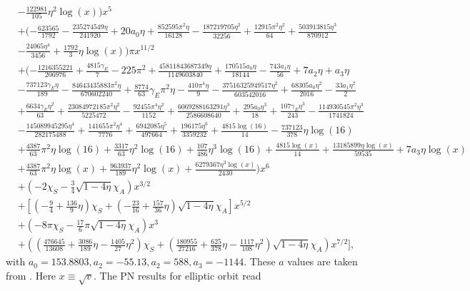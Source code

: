 \documentclass[prd,aps,a4paper,superscriptaddress,twocolumn,footinbib,showpacs]{revtex4}
\begin{document}
\begin{widetext}
\begin{align}
&-\frac{122981}{105} \eta ^2 \log(x))x^5\nonumber\\
&+(-\frac{623565 }{1792}-\frac{235274549 \eta }{241920}+20 a_0  \eta +\frac{852595 \pi ^2 \eta }{16128}-\frac{187219705 \eta ^2}{32256}+\frac{12915 \pi ^2 \eta ^2}{64}+\frac{503913815 \eta ^3}{870912}\nonumber\\
&-\frac{24065 \eta ^4}{3456}+\frac{1792}{3} \eta  \log(x)) \pi x^{11/2}\nonumber\\
&+(-\frac{1216355221}{206976}+\frac{4815 \gamma_E}{7}-225 \pi ^2+\frac{45811843687349 \eta }{1149603840}+\frac{170515 a_0 \eta }{18144}-\frac{743 a_1 \eta }{56}+7 a_2 \eta +a_3 \eta \nonumber\\
&-\frac{737123 \gamma_E \eta }{189}-\frac{84643435883 \pi ^2 \eta }{670602240}+\frac{8774}{63} \gamma_E \pi ^2 \eta -\frac{410 \pi ^4 \eta }{9}-\frac{37516325949517 \eta ^2}{603542016}+\frac{68305 a_0 \eta ^2}{2016}-\frac{33 a_1 \eta ^2}{2}\nonumber\\
&+\frac{6634 \gamma_E \eta ^2}{63}+\frac{23084972185 \pi ^2 \eta ^2}{5225472}-\frac{92455 \pi ^4 \eta ^2}{1152}+\frac{6069288163291 \eta ^3}{2586608640}+\frac{295 a_0 \eta ^3}{18}+\frac{107 \gamma_E \eta ^3}{243}-\frac{114930545 \pi ^2 \eta ^3}{1741824}\nonumber\\
&-\frac{145089945295 \eta ^4}{282175488}+\frac{141655 \pi ^2 \eta ^4}{7776}+\frac{6942085 \eta ^5}{497664}+\frac{196175 \eta ^6}{3359232}+\frac{4815 \log(16)}{14}-\frac{737123}{378} \eta  \log(16)\nonumber\\
&+\frac{4387}{63} \pi ^2 \eta  \log(16)+\frac{3317}{63} \eta ^2 \log(16)+\frac{107}{486} \eta ^3 \log(16)+\frac{4815 \log(x)}{14}+\frac{13185899 \eta  \log(x)}{59535}+7 a_3 \eta  \log(x)\nonumber\\
&+\frac{4387}{63} \pi ^2 \eta  \log(x)+\frac{963937}{189} \eta ^2 \log(x)+\frac{6279367 \eta ^3 \log(x)}{2430})x^6\nonumber\\
&+(-2\chi_S-\frac{3}{4}\sqrt{1-4\eta}\chi_A)x^{3/2}\nonumber\\
&+[(-\frac{9}{4}+\frac{136}{9}\eta)\chi_S+(-\frac{23}{16}
+\frac{157}{36}\eta)\sqrt{1-4\eta}\chi_A]x^{5/2}\nonumber\\
&+(-8\pi\chi_S-\frac{17}{6}\pi\sqrt{1-4\eta}\chi_A)x^3\nonumber\\
&+((\frac{476645}{13608}+\frac{3086}{189}\eta-\frac{1405}{27}\eta^2)\chi_S
+(\frac{180955}{27216}+\frac{625}{378}\eta-\frac{1117}{108}\eta^2)\sqrt{1-4\eta}\chi_A)x^{7/2}],\label{energyfluxwo}
\end{align}
with $a_0=153.8803,a_2=-55.13,a_2=588,a_3=-1144$. These $a$ values are taken from \cite{PhysRevD.85.064010,PhysRevD.95.024038}. Here $x\equiv\sqrt{v}$. The PN results for elliptic orbit read \cite{PhysRevD.52.821,PhysRevD.54.4813}

\end{widetext}
\end{document}
